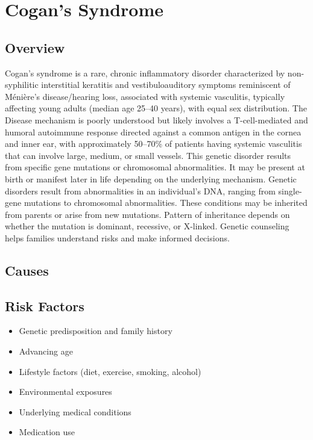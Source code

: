 \chapter{Cogan's Syndrome}
\label{sec:Cogan's Syndrome}

\section{Overview}
Cogan's syndrome is a rare, chronic inflammatory disorder characterized by non-syphilitic interstitial keratitis and vestibuloauditory symptoms reminiscent of Ménière's disease/hearing loss, associated with systemic vasculitis, typically affecting young adults (median age 25--40 years), with equal sex distribution. The Disease mechanism is poorly understood but likely involves a T-cell-mediated and humoral autoimmune response directed against a common antigen in the cornea and inner ear, with approximately 50--70\% of patients having systemic vasculitis that can involve large, medium, or small vessels. This genetic disorder results from specific gene mutations or chromosomal abnormalities. It may be present at birth or manifest later in life depending on the underlying mechanism. Genetic disorders result from abnormalities in an individual's DNA, ranging from single-gene mutations to chromosomal abnormalities. These conditions may be inherited from parents or arise from new mutations. Pattern of inheritance depends on whether the mutation is dominant, recessive, or X-linked. Genetic counseling helps families understand risks and make informed decisions.
\section{Causes}
\section{Risk Factors}

\begin{itemize}[noitemsep]
  \item Genetic predisposition and family history
  \item Advancing age
  \item Lifestyle factors (diet, exercise, smoking, alcohol)
  \item Environmental exposures
  \item Underlying medical conditions
  \item Medication use
\end{itemize}
